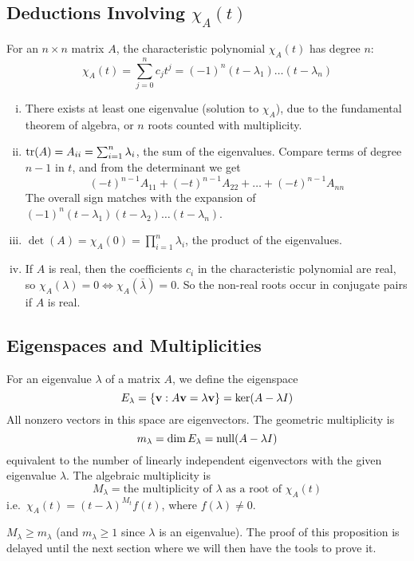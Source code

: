 \subsection{Deductions Involving \(\chi_A(t)\)}
For an \(n \times n\) matrix \(A\), the characteristic polynomial \(\chi_A(t)\) has degree \(n\):
\[ \chi_A(t) = \sum_{j = 0}^n c_j t^j = (-1)^n(t-\lambda_1)\dots(t-\lambda_n) \]
\begin{enumerate}[(i)]
	\item There exists at least one eigenvalue (solution to \(\chi_A\)), due to the fundamental theorem of algebra, or \(n\) roots counted with multiplicity.
	\item \(\tr(A) = A_{ii} = \sum_{i=1}^n \lambda_i\), the sum of the eigenvalues. Compare terms of degree \(n-1\) in \(t\), and from the determinant we get
	      \[ (-t)^{n-1}A_{11} + (-t)^{n-1}A_{22} + \dots + (-t)^{n-1}A_{nn} \]
	      The overall sign matches with the expansion of \((-1)^n(t-\lambda_1)(t-\lambda_2)\dots(t-\lambda_n)\).
	\item \(\det(A) = \chi_A(0) = \prod_{i=1}^n \lambda_i\), the product of the eigenvalues.
	\item If \(A\) is real, then the coefficients \(c_i\) in the characteristic polynomial are real, so \(\chi_A(\lambda) = 0 \iff \chi_A(\overline\lambda) = 0\). So the non-real roots occur in conjugate pairs if \(A\) is real.
\end{enumerate}

\subsection{Eigenspaces and Multiplicities}
For an eigenvalue \(\lambda\) of a matrix \(A\), we define the eigenspace
\[ E_\lambda = \{ \vb v : A \vb v = \lambda \vb v \} = \ker (A - \lambda I) \]
All nonzero vectors in this space are eigenvectors. The geometric multiplicity is
\[ m_\lambda = \dim E_\lambda = \operatorname{null} (A - \lambda I) \]
equivalent to the number of linearly independent eigenvectors with the given eigenvalue \(\lambda\). The algebraic multiplicity is
\[ M_\lambda = \text{the multiplicity of } \lambda \text{ as a root of } \chi_A(t) \]
i.e.\ \(\chi_A(t) = (t - \lambda)^{M_t} f(t)\), where \(f(\lambda) \neq 0\).

\begin{proposition}
	\(M_\lambda \geq m_\lambda\) (and \(m_\lambda \geq 1\) since \(\lambda\) is an eigenvalue). The proof of this proposition is delayed until the next section where we will then have the tools to prove it.
\end{proposition}

